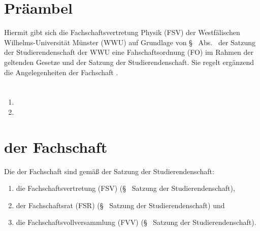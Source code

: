 \documentclass[
	a4paper,
	12pt,
	oneside,
	parskip=half-,
	pagesize,
	headsepline,
	german,
	ngerman
]{scrartcl}
\title{\replaced{Fachschafsordnung}{Satzung}}
\subtitle{der Fachschaft\deleted{svertretung} Physik\\
der Westfälischen Wilhelms-Universität Münster}
\date{in der Fassung vom \formatdate{11}{11}{2011}}
\author{}
\begin{document}
\maketitle

\section{Präambel}
Hiermit gibt sich die Fachschaftsvertretung Physik (FSV) der Westfälischen Wilhelms-Universi\-tät Münster (WWU) auf Grundlage von §~ Abs.~ der Satzung der Studierendenschaft der WWU eine Fahschaftsordnung (FO) im Rahmen der geltenden Gesetze und der Satzung der Studierendenschaft. Sie regelt ergänzend die Angelegenheiten der Fachschaft .


\section{}
\begin{enumerate}
	\item {}
	\item {}
\end{enumerate}
\setcounter{section}{1}
\section{ der Fachschaft}
Die  der Fachschaft sind gemäß der Satzung der Studierendenschaft:
\begin{enumerate}
	\item die Fachschaftsvertretung (FSV) (§~ Satzung der Studierendenschaft),
	\item der Fachschaftsrat (FSR) (§~ Satzung der Studierendenschaft) und 
	\item die Fachschaftsvollversammlung (FVV) (§~ Satzung der Studierendenschaft).
\end{enumerate}
\end{document}
